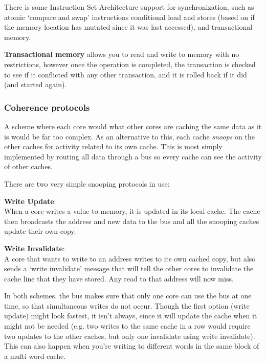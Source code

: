 There is some Instruction Set Architecture support for synchronization, such as
atomic `compare and swap' instructions conditional load and stores (based on if
the memory location has mutated since it was last accessed), and transactional
memory.

\textbf{Transactional memory} allows you to read and write to memory with no
restrictions, however once the operation is completed, the transaction is
checked to see if it conflicted with any other transaction, and it is rolled
back if it did (and started again).

\subsubsection{Coherence protocols}

A scheme where each core would what other cores are caching the same data as it
is would be far too complex. As an alternative to this, each cache
\textit{snoops} on the other caches for activity related to its own cache. This
is most simply implemented by routing all data through a bus so every cache can
see the activity of other caches.

There are two very simple snooping protocols in use:

\begin{description}
  \item \textbf{Write Update}:\\
    When a core writes a value to memory, it is updated in its local cache. The
    cache then broadcasts the address and new data to the bus and all the
    snooping caches update their own copy.
  \item \textbf{Write Invalidate}:\\
    A core that wants to write to an address writes to its own cached copy, but
    also sends a `write invalidate' message that will tell the other cores
    to invalidate the cache line that they have stored. Any read to that address
    will now miss.
\end{description}

In both schemes, the bus makes sure that only one core can use the bus at one
time, so that simultaneous writes do not occur. Though the first option (write
update) might look fastest, it isn't always, since it will update the cache when
it might not be needed (e.g. two writes to the same cache in a row would require
two updates to the other caches, but only one invalidate using write
invalidate). This can also happen when you're writing to different words in the
same block of a multi word cache.

